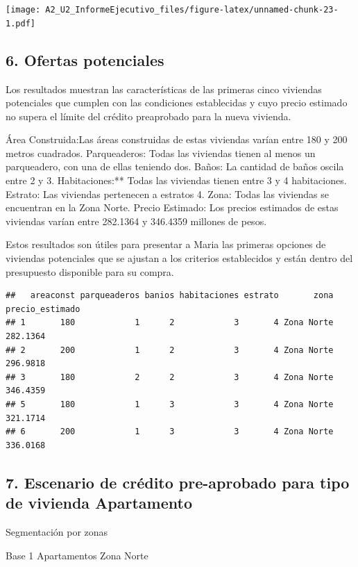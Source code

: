 \documentclass[
]{article}
\begin{document}
\texttt{[image: A2\_U2\_InformeEjecutivo\_files/figure-latex/unnamed-chunk-23-1.pdf]}

\subsection{6. Ofertas potenciales}\label{ofertas-potenciales}

Los resultados muestran las características de las primeras cinco
viviendas potenciales que cumplen con las condiciones establecidas y
cuyo precio estimado no supera el límite del crédito preaprobado para la
nueva vivienda.

Área Construida:Las áreas construidas de estas viviendas varían entre
180 y 200 metros cuadrados. Parqueaderos: Todas las viviendas tienen al
menos un parqueadero, con una de ellas teniendo dos. Baños: La cantidad
de baños oscila entre 2 y 3. Habitaciones:** Todas las viviendas tienen
entre 3 y 4 habitaciones. Estrato: Las viviendas pertenecen a estratos
4. Zona: Todas las viviendas se encuentran en la Zona Norte. Precio
Estimado: Los precios estimados de estas viviendas varían entre 282.1364
y 346.4359 millones de pesos.

Estos resultados son útiles para presentar a Maria las primeras opciones
de viviendas potenciales que se ajustan a los criterios establecidos y
están dentro del presupuesto disponible para su compra.

\begin{verbatim}
##   areaconst parqueaderos banios habitaciones estrato       zona precio_estimado
## 1       180            1      2            3       4 Zona Norte        282.1364
## 2       200            1      2            3       4 Zona Norte        296.9818
## 3       180            2      2            3       4 Zona Norte        346.4359
## 5       180            1      3            3       4 Zona Norte        321.1714
## 6       200            1      3            3       4 Zona Norte        336.0168
\end{verbatim}

\subsection{7. Escenario de crédito pre-aprobado para tipo de vivienda
Apartamento}\label{escenario-de-cruxe9dito-pre-aprobado-para-tipo-de-vivienda-apartamento}

Segmentación por zonas

Base 1 Apartamentos Zona Norte
\end{document}
